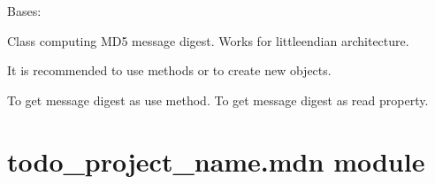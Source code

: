 \documentclass[letterpaper,10pt,english]{sphinxmanual}
\begin{document}
\begin{fulllineitems}
\label{\detokenize{todo_project_name:todo_project_name.md5.MD5}}
\pysigstartsignatures
{}
\pysigstopsignatures
\sphinxAtStartPar
Bases: {\hyperref[\detokenize{todo_project_name:todo_project_name.mdn.MDN}]{}}

\sphinxAtStartPar
Class computing MD5 message digest. Works for little\sphinxhyphen{}endian architecture.

\sphinxAtStartPar
It is recommended to use methods  or 
to create new objects.

\sphinxAtStartPar
To get message digest as  use  method.
To get message digest as  read  property.


\end{fulllineitems}



\section{todo\_project\_name.mdn module}
\label{\detokenize{todo_project_name:module-todo_project_name.mdn}}\label{\detokenize{todo_project_name:todo-project-name-mdn-module}}
\end{document}
